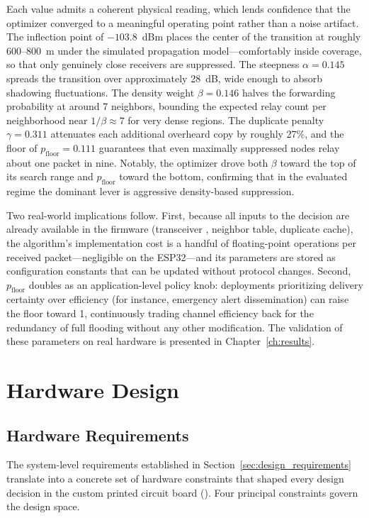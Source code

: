 \documentclass[english,bachelor]{tfgitic}[2026/01/22]
\begin{document}
Each value admits a coherent physical reading, which lends confidence that the optimizer converged to a meaningful operating point rather than a noise artifact. The inflection point of $-103.8$~dBm places the center of the  transition at roughly 600--800~m under the simulated propagation model---comfortably inside coverage, so that only genuinely close receivers are suppressed. The steepness $\alpha = 0.145$ spreads the transition over approximately 28~dB, wide enough to absorb shadowing fluctuations. The density weight $\beta = 0.146$ halves the forwarding probability at around 7 neighbors, bounding the expected relay count per neighborhood near $1/\beta \approx 7$ for very dense regions. The duplicate penalty $\gamma = 0.311$ attenuates each additional overheard copy by roughly 27\%, and the floor of $p_{\text{floor}} = 0.111$ guarantees that even maximally suppressed nodes relay about one packet in nine. Notably, the optimizer drove both $\beta$ toward the top of its search range and $p_{\text{floor}}$ toward the bottom, confirming that in the evaluated regime the dominant lever is aggressive density-based suppression.
 
Two real-world implications follow. First, because all inputs to the decision are already available in the firmware (transceiver , neighbor table, duplicate cache), the algorithm's implementation cost is a handful of floating-point operations per received packet---negligible on the ESP32---and its parameters are stored as configuration constants that can be updated without protocol changes. Second, $p_{\text{floor}}$ doubles as an application-level policy knob: deployments prioritizing delivery certainty over efficiency (for instance, emergency alert dissemination) can raise the floor toward 1, continuously trading channel efficiency back for the redundancy of full flooding without any other modification. The validation of these parameters on real hardware is presented in Chapter~\ref{ch:results}.

\section{Hardware Design}
\label{ch:hardware}

\subsection{Hardware Requirements}
\label{sec:hw_requirements}

The system-level requirements established in Section~\ref{sec:design_requirements}
translate into a concrete set of hardware constraints that shaped every design
decision in the custom printed circuit board (). Four principal constraints govern
the design space.
\end{document}
